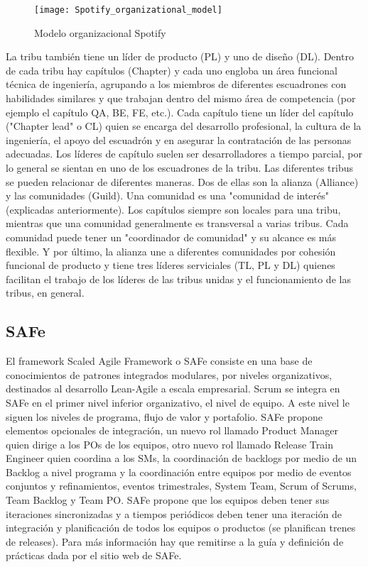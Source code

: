 \begin{figure}[h]
  \centering
  \texttt{[image: Spotify\_organizational\_model]}
  \caption{Modelo organizacional Spotify}
  \centering
  \label{fig:Spotify_organizational_model} %
\end{figure}

La tribu también tiene un líder de producto (PL) y uno de diseño (DL). Dentro de cada tribu hay capítulos (Chapter) y cada uno engloba un área funcional técnica de ingeniería, agrupando a los miembros de diferentes escuadrones con habilidades similares y que trabajan dentro del mismo área de competencia (por ejemplo el capítulo QA, BE, FE, etc.). Cada capítulo tiene un líder del capítulo ("Chapter lead" o CL) quien se encarga del desarrollo profesional, la cultura de la ingeniería, el apoyo del escuadrón y en asegurar la contratación de las personas adecuadas. Los líderes de capítulo suelen ser desarrolladores a tiempo parcial, por lo general se sientan en uno de los escuadrones de la tribu. 
Las diferentes tribus se pueden relacionar de diferentes maneras. Dos de ellas son la alianza (Alliance) y las comunidades (Guild). Una comunidad es una "comunidad de interés" (explicadas anteriormente). Los capítulos siempre son locales para una tribu, mientras que una comunidad generalmente es transversal a varias tribus. Cada comunidad puede tener un "coordinador de comunidad" y su alcance es más flexible. Y por último, la alianza une a diferentes comunidades por cohesión funcional de producto y tiene tres líderes serviciales (TL, PL y DL) quienes facilitan el trabajo de los líderes de las tribus unidas y el funcionamiento de las tribus, en general.

\subsection{SAFe}

El framework Scaled Agile Framework o SAFe consiste en una base de conocimientos de patrones integrados modulares, por niveles organizativos, destinados al desarrollo Lean-Agile a escala empresarial. Scrum se integra en SAFe en el primer nivel inferior organizativo, el nivel de equipo. A este nivel le siguen los niveles de programa, flujo de valor y portafolio. SAFe propone elementos opcionales de integración, un nuevo rol llamado Product Manager quien dirige a los POs de los equipos, otro nuevo rol llamado Release Train Engineer quien coordina a los SMs, la coordinación de backlogs por medio de un Backlog a nivel programa y la coordinación entre equipos por medio de eventos conjuntos y refinamientos, eventos trimestrales, System Team, Scrum of Scrums, Team Backlog y Team PO. SAFe propone que los equipos deben tener sus iteraciones sincronizadas y a tiempos periódicos deben tener una iteración de integración y planificación de todos los equipos o productos  (se planifican trenes de releases). Para más información hay que remitirse a la guía y definición de prácticas dada por el sitio web de SAFe.

